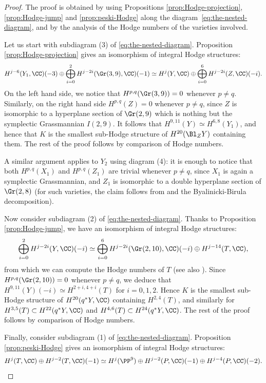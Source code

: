 \begin{proof}
The proof is obtained by using Propositions \ref{prop:Hodge-projection}, \ref{prop:Hodge-jump} and
\ref{prop:peski-Hodge} along the diagram~\eqref{eq:the-nested-diagram}, and by the analysis of the Hodge numbers of the varieties involved.

Let us start with subdiagram (3) of \eqref{eq:the-nested-diagram}. Proposition \ref{prop:Hodge-projection} gives an isomorphism of integral Hodge structures:
\[
H^{j-6}(Y_1,\CC)(-3) \oplus \bigoplus_{i=0}^2 H^{j-2i}(\Gr(3,9),\CC)(-1) \simeq
H^j(Y,\CC) \oplus \bigoplus_{i=0}^{6}H^{j-2i}(Z,\CC)(-i).
\]
On the left hand side, we notice that $H^{p,q}(\Gr(3,9))=0$ whenever $p \neq q$.
Similarly, on the right hand side $H^{p,q}(Z)=0$ whenever $p \neq q$, since $Z$ is isomorphic to a hyperplane
section of $\Gr(2,9)$ which is nothing but the symplectic Grassmannian $I(2,9)$.
It follows that $H^{9,11}(Y) \simeq H^{6,8}(Y_1)$, and hence that $K$ is the smallest sub-Hodge structure
of $H^{20}(\Bl_Z Y)$ containing them. The rest of the proof follows by comparison of Hodge numbers.

A similar argument applies to $Y_2$ using diagram (4): it is enough to notice that both $H^{p,q}(X_1)$ and $H^{p,q}(Z_1)$ are trivial
whenever $p \neq q$, since $X_1$ is again a symplectic Grassmannian,
and $Z_1$ is isomorphic to a double hyperplane section of $\Gr(2,8)$
(for such varieties, the claim follows from \cite[2.10]{vlad-bi} and the Byalinicki-Birula
decomposition).

Now consider subdiagram (2) of \eqref{eq:the-nested-diagram}. Thanks to Proposition \ref{prop:Hodge-jump}, we have an isomorphism of integral Hodge structures:
\begin{equation*}\label{eq:hodge-Y-and-T}
\bigoplus_{i=0}^2 H^{j-2i}(Y,\CC)(-i) \simeq \bigoplus_{i=0}^6 H^{j-2i}(\Gr(2,10),\CC)(-i) \oplus H^{j-14}(T,\CC),
\end{equation*}
from which we can compute the Hodge numbers of $T$ (see also \cite[Prop.\,3.27]{fm}).
Since $H^{p,q}(\Gr(2,10))=0$ whenever $p\neq q$, we deduce that $H^{9,11}(Y)(-i) \simeq H^{2+i,4+i}(T)$ for $i=0,1,2$. Hence $K$ is the smallest sub-Hodge structure of $H^{20}(q^* Y,\CC)$ containing $H^{2,4}(T)$, and similarly for $H^{3,5}(T) \subset H^{22}(q^*Y,\CC)$ and $H^{4,6}(T) \subset H^{24}(q^*Y,\CC)$.
The rest of the proof follows by comparison of Hodge numbers.

Finally, consider subdiagram (1) of \eqref{eq:the-nested-diagram}. Proposition \ref{prop:peski-Hodge} gives an isomorphism of integral Hodge structures:
\begin{equation*}\label{eq:hodge-P-and-T}
H^j(T,\CC) \oplus H^{j-2}(T,\CC)(-1) \simeq H^j(\PP^9) \oplus H^{j-2}(P,\CC)(-1) \oplus H^{j-4}(P,\CC)(-2).
\end{equation*}


\end{proof}
